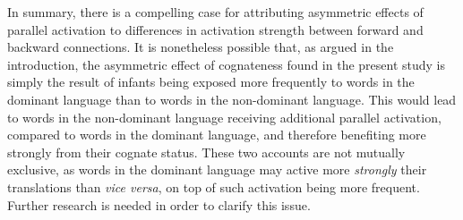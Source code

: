 \documentclass[
]{article}
\begin{document}
In summary, there is a compelling case for attributing asymmetric
effects of parallel activation to differences in activation strength
between forward and backward connections. It is nonetheless possible
that, as argued in the introduction, the asymmetric effect of
cognateness found in the present study is simply the result of infants
being exposed more frequently to words in the dominant language than to
words in the non-dominant language. This would lead to words in the
non-dominant language receiving additional parallel activation, compared
to words in the dominant language, and therefore benefiting more
strongly from their cognate status. These two accounts are not mutually
exclusive, as words in the dominant language may active more
\emph{strongly} their translations than \emph{vice versa}, on top of
such activation being more frequent. Further research is needed in order
to clarify this issue.
\end{document}
